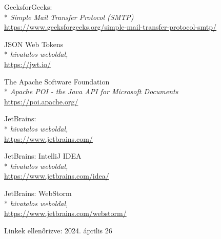 \begin{thebibliography}{x}
 GeeksforGeeks: \\*
\textit{Simple Mail Transfer Protocol (SMTP)}
\\ \url{https://www.geeksforgeeks.org/simple-mail-transfer-protocol-smtp/}

 JSON Web Tokens\\*
\textit{hivatalos weboldal,}
\\ \url{https://jwt.io/}

 The Apache Software Foundation\\*
\textit{Apache POI - the Java API for Microsoft Documents}
\\ \url{https://poi.apache.org/}

 JetBrains:\\*
\textit{hivatalos weboldal,}
\\ \url{https://www.jetbrains.com/}

 JetBrains: IntelliJ IDEA\\*
\textit{hivatalos weboldal,}
\\ \url{https://www.jetbrains.com/idea/}

 JetBrains: WebStorm\\*
\textit{hivatalos weboldal,}
\\ \url{https://www.jetbrains.com/webstorm/}

\end{thebibliography}

Linkek ellenőrizve: 2024. április 26